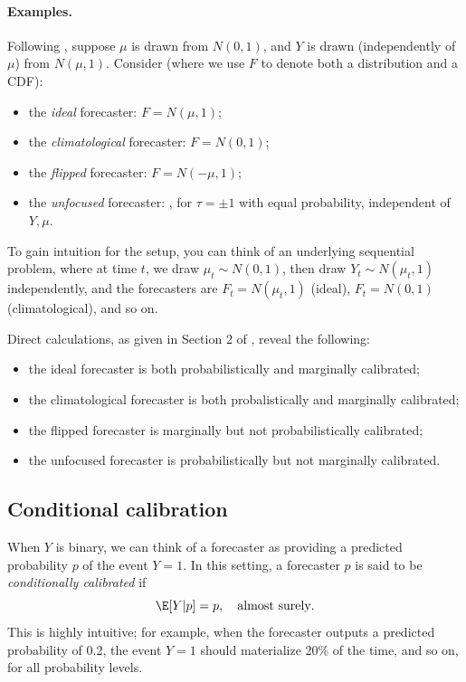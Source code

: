 \documentclass{article}
\begin{document}
\paragraph{Examples.}

Following \citet{gneiting2007probabilistic}, suppose $\mu$ is drawn from $N(0, 
1)$, and $Y$ is drawn (independently of $\mu$) from $N(\mu, 1)$. Consider (where
we use $F$ to denote both a distribution and a CDF):

\begin{itemize}
\item the \emph{ideal} forecaster: $F = N(\mu, 1)$;
\item the \emph{climatological} forecaster: $F = N(0, 1)$;
\item the \emph{flipped} forecaster: $F = N(-\mu, 1)$;  
\item the \emph{unfocused} forecaster: , for $\tau = \pm 1$ with equal probability, independent 
  of $Y,\mu$.
\end{itemize}

To gain intuition for the setup, you can think of an underlying sequential
problem, where at time $t$, we draw $\mu_t \sim N(0,1)$, then draw $Y_t \sim
N(\mu_t, 1)$ independently, and the forecasters are $F_t = N(\mu_t, 1)$ (ideal),
$F_t = N(0, 1)$ (climatological), and so on.

Direct calculations, as given in Section 2 of \citet{gneiting2007probabilistic}, 
reveal the following: 

\begin{itemize}
\item the ideal forecaster is both probabilistically and marginally calibrated;  
\item the climatological forecaster is both probalistically and marginally
  calibrated;
\item the flipped forecaster is marginally but not probabilistically
  calibrated; 
\item the unfocused forecaster is probabilistically but not marginally
  calibrated.
\end{itemize}

\subsection{Conditional calibration}

When $Y$ is binary, we can think of a forecaster as providing a predicted
probability $p$ of the event $Y = 1$. In this setting, a forecaster $p$ is said
to be \emph{conditionally calibrated} if
\begin{equation}
\label{eq:cond_calib}
\E[Y|p] = p, \quad \text{almost surely}.  
\end{equation}
This is highly intuitive; for example, when the forecaster outputs a predicted
probability of 0.2, the event $Y=1$ should materialize 20\% of the time, and so
on, for all probability levels. 
\end{document}
